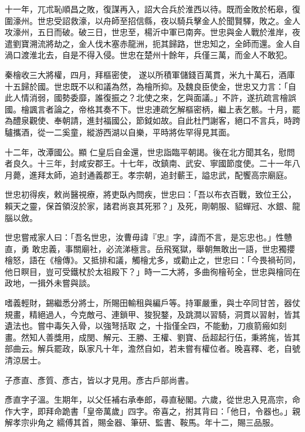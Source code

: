 \begin{pinyinscope}
 十一年，兀朮恥順昌之敗，復謀再入，詔大合兵於淮西以待。既而金敗於柘皋，復圍濠州。世忠受詔救濠，以舟師至招信縣，夜以騎兵擊金人於聞賢驛，敗之。金人攻濠州，五日而破。破三日，世忠至，楊沂中軍已南奔。世忠與金人戰於淮岸，夜遣劉寶溯流將劫之，金人伐木塞赤龍洲，扼其歸路，世忠知之，全師而還。金人自渦口渡淮北去，自是不得入侵。世忠在楚州十餘年，兵僅三萬，而金人不敢犯。



 秦檜收三大將權，四月，拜樞密使，
 遂以所積軍儲錢百萬貫，米九十萬石，酒庫十五歸於國。世忠既不以和議為然，為檜所抑。及魏良臣使金，世忠又力言：「自此人情消弱，國勢委靡，誰復振之？北使之來，乞與面議。」不許，遂抗疏言檜誤國。檜諷言者論之，帝格其奏不下。世忠連疏乞解樞密柄，繼上表乞骸。十月，罷為醴泉觀使、奉朝請，進封福國公，節鉞如故。自此杜門謝客，絕口不言兵，時跨驢攜酒，從一二奚童，縱游西湖以自樂，平時將佐罕得見其面。



 十二年，改潭國公。顯
 仁皇后自金還，世忠詣臨平朝謁。後在北方聞其名，慰問者良久。十三年，封咸安郡王。十七年，改鎮南、武安、寧國節度使。二十一年八月薨，進拜太師，追封通義郡王。孝宗朝，追封蘄王，謚忠武，配饗高宗廟庭。



 世忠初得疾，敕尚醫視療，將吏臥內問疾，世忠曰：「吾以布衣百戰，致位王公，賴天之靈，保首領沒於家，諸君尚哀其死邪？」及死，剛朝服、貂蟬冠、水銀、龍腦以斂。



 世忠嘗戒家人曰：「吾名世忠，汝曹毋諱『忠』字，諱而不言，是忘忠也。」性戇直，勇
 敢忠義，事關廟社，必流涕極言。岳飛冤獄，舉朝無敢出一語，世忠獨攖檜怒，語在《檜傳》。又抵排和議，觸檜尤多，或勸止之，世忠曰：「今畏禍茍同，他日瞑目，豈可受鐵杖於太祖殿下？」時一二大將，多曲徇檜茍全，世忠與檜同在政地，一揖外未嘗與談。



 嗜義輕財，錫繼悉分將士，所賜田輸租與編戶等。持軍嚴重，與士卒同甘苦，器仗規畫，精絕過人，今克敵弓、連鎖甲、狻猊鍪，及跳澗以習騎，洞貫以習射，皆其遺法也。嘗中毒矢入骨，以強弩括取
 之，十指僅全四，不能動，刀痕箭瘢如刻畫。然知人善獎用，成閔、解元、王勝、王權、劉寶、岳超起行伍，秉將旄，皆其部曲云。解兵罷政，臥家凡十年，澹然自如，若未嘗有權位者。晚喜釋、老，自號清涼居士。



 子彥直、彥質、彥古，皆以才見用。彥古戶部尚書。



 彥直字子溫。生期年，以父任補右承奉郎，尋直秘閣。六歲，從世忠入見高宗，命作大字，即拜命跪書「皇帝萬歲」四字。帝喜之，拊其背曰：「他日，令器也。」親解孝宗丱角之
 繻傅其首，賜金器、筆研、監書、鞍馬。年十二，賜三品服。




\end{pinyinscope}
